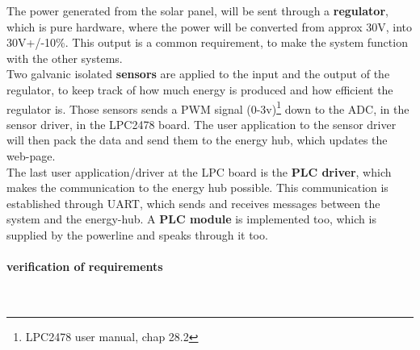 The power generated from the solar panel, will be sent through a \textbf{regulator}, which is pure hardware, where the power will be converted from approx 30V, into 30V+/-10\%. This output is a common requirement, to make the system function with the other systems. \\
Two galvanic isolated \textbf{sensors} are applied to the input and the output of the regulator, to keep track of how much energy is produced and how efficient the regulator is. Those sensors sends a PWM signal (0-3v)\footnote{LPC2478 user manual, chap 28.2} down to the ADC, in the sensor driver, in the LPC2478 board. The user application to the sensor driver will then pack the data and send them to the energy hub, which updates the web-page. \\
The last user application/driver at the LPC board is the \textbf{PLC driver}, which makes the communication to the energy hub possible. This communication is established through UART, which sends and receives messages between the system and the energy-hub. A\textbf{ PLC module} is implemented too, which is supplied by the powerline and speaks through it too. 

\paragraph{verification of requirements}\mbox{}\\
